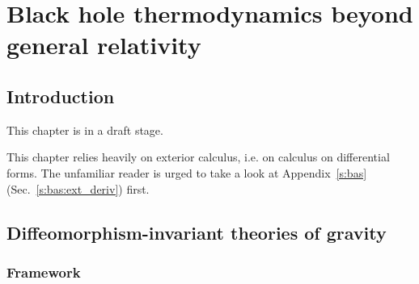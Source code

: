 \chapter{Black hole thermodynamics beyond general relativity}
\label{s:tha}

\minitoc

\section{Introduction}

This chapter is in a draft stage.

\medskip

This chapter relies heavily on exterior calculus, i.e. on calculus on differential forms.
The unfamiliar reader is urged to take a look at Appendix~\ref{s:bas}
(Sec.~\ref{s:bas:ext_deriv}) first.

\section{Diffeomorphism-invariant theories of gravity}

\subsection{Framework} \label{s:tha:framework}


